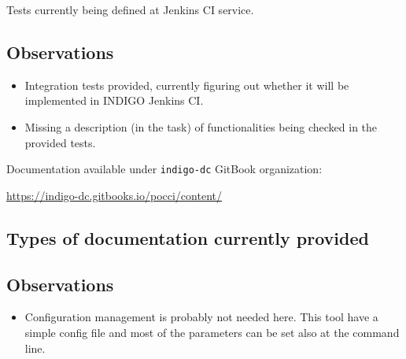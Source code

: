 \documentclass[a4wide,11pt]{article}
\begin{document}

\label{sec:func_int_test}

    Tests currently being defined at Jenkins CI service.
    
    
\subsection{Observations}
\begin{itemize}
        \item Integration tests provided, currently figuring out whether it will be implemented in INDIGO Jenkins CI.
        \item Missing a description (in the task) of functionalities being checked in the provided tests.
    \end{itemize}



\label{sec:gitbook}
Documentation available under \texttt{indigo-dc} GitBook organization: \vspace{0.1em} \begin{center}\url{https://indigo-dc.gitbooks.io/pocci/content/}\end{center} 
\subsection{Types of documentation currently provided}
\begin{center}
\end{center}



\label{sec:configuration}



\subsection{Observations}
\begin{itemize}
        \item Configuration management is probably not needed here. This tool have a simple config file and most of the parameters can be set also at the command line.
    \end{itemize}


\newpage

\end{document}
